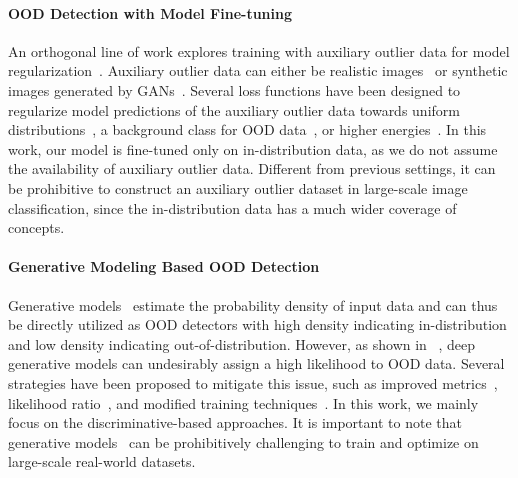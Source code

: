 \documentclass[final]{cvpr}
\begin{document}
\vspace{-0.4cm}
\paragraph{OOD Detection with Model Fine-tuning} An orthogonal line of work explores training with auxiliary outlier data for model regularization~\cite{bevandic2018discriminative,geifman2019selectivenet,malinin2018predictive,mohseni2020self,subramanya2017confidence, liu2020energy}. Auxiliary outlier data can either be realistic images~\cite{hendrycks2018deep,mohseni2020self,papadopoulos2019outlier,liu2020energy,chen2020robust-new} or synthetic images generated by GANs~\cite{lee2018training}. Several loss functions have been designed to regularize model predictions of the auxiliary outlier data towards uniform distributions~\cite{lee2018training}, a background class for OOD data~\cite{chen2020robust-new, mohseni2020self}, or higher energies~\cite{liu2020energy}. 
In this work, our model is fine-tuned only on in-distribution data, as we do not assume the availability of auxiliary outlier data. Different from previous settings, it can be prohibitive to construct an auxiliary outlier dataset in large-scale image classification, since the in-distribution data has a much wider coverage of concepts.

\paragraph{Generative Modeling Based OOD Detection} Generative models~\cite{kingma2013auto,tabak2013family,rezende2014stochastic,dinh2017density,van2016conditional} estimate the probability density of input data and can thus be directly utilized as OOD detectors with high density indicating in-distribution and low density indicating out-of-distribution. However, as shown in ~\cite{nalisnick2018deep}, deep generative models can undesirably assign a high likelihood to OOD data. Several strategies have been proposed to mitigate this issue, such as improved metrics~\cite{choi2018generative}, likelihood ratio~\cite{ren2019likelihood,serra2019input}, and modified training techniques~\cite{hendrycks2018deep}. In this work, we mainly focus on the discriminative-based approaches. It is important to note that generative models~\cite{hinz2018generating} can be prohibitively challenging to train and optimize on large-scale real-world datasets.

\vspace{-0.4cm}
\end{document}
